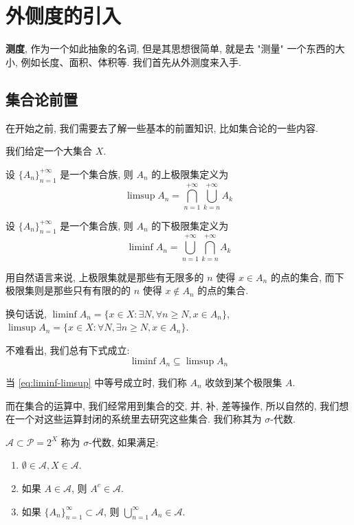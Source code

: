 \section{外侧度的引入}

\textbf{测度}, 作为一个如此抽象的名词, 但是其思想很简单, 就是去 "测量" 一个东西的大小, 例如长度、面积、体积等. 我们首先从外测度来入手.

\subsection{集合论前置}

在开始之前, 我们需要去了解一些基本的前置知识, 比如集合论的一些内容.

我们给定一个大集合 $X$.

\begin{definition}[上极限集]\label{def:suplim-set}
    设 $\{A_n\}_{n=1}^{+\infty}$ 是一个集合族, 则 $A_n$ 的上极限集定义为
    \[
    \limsup A_n = \bigcap_{n=1}^{+\infty} \bigcup_{k=n}^{+\infty} A_k
    \]
\end{definition}
\begin{definition}[下极限集]\label{def:inflim-set}
    设 $\{A_n\}_{n=1}^{+\infty}$ 是一个集合族, 则 $A_n$ 的下极限集定义为
    \[
    \liminf A_n = \bigcup_{n=1}^{+\infty} \bigcap_{k=n}^{+\infty} A_k
    \]
\end{definition}

用自然语言来说, 上极限集就是那些有无限多的 $n$ 使得 $x \in A_n$ 的点的集合, 而下极限集则是那些只有有限的的 $n$ 使得 $x \notin A_n$ 的点的集合.

换句话说, $\liminf A_n = \{x \in X :\exists N, \forall n \geq N, x \in A_n\}$, $\limsup A_n = \{x \in X :\forall N, \exists n \geq N, x \in A_n\}$.

不难看出, 我们总有下式成立:
\begin{equation}
    \liminf A_n \subseteq \limsup A_n \label{eq:liminf-limsup}
\end{equation}

当 \cref{eq:liminf-limsup} 中等号成立时, 我们称 $A_n$ 收敛到某个极限集 $A$.

而在集合的运算中, 我们经常用到集合的交, 并, 补, 差等操作, 所以自然的, 我们想在一个对这些运算封闭的系统里去研究这些集合. 我们称其为 $\sigma$-代数.

\begin{definition}[$\sigma$-代数]\label{def:sigma-algebra}

    $\mathscr{A} \subset \mathcal{P} = 2^X$ 称为 $\sigma$-代数, 如果满足:
    \begin{enumerate}
        \item $\emptyset \in \mathscr{A}, X \in \mathscr{A}$.
        \item 如果 $A \in \mathscr{A}$, 则 $A^c \in \mathscr{A}$.
        \item 如果 $\{A_n\}_{n=1}^{\infty} \subset \mathscr{A}$, 则 $\bigcup\limits_{n=1}^{\infty} A_n \in \mathscr{A}$.
    \end{enumerate}
\end{definition}


